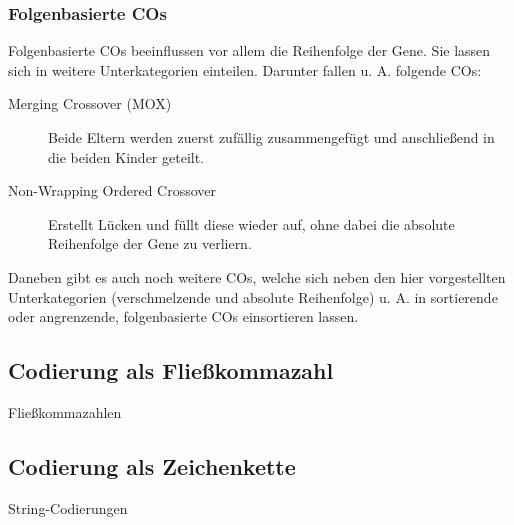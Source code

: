 	\subsubsection{Folgenbasierte COs}
	
		Folgenbasierte COs beeinflussen vor allem die Reihenfolge der Gene. Sie lassen sich in weitere Unterkategorien einteilen. Darunter fallen u. A. folgende COs:
		
		\begin{description}
			\item[Merging Crossover (MOX)] Beide Eltern werden zuerst zufällig zusammengefügt und anschließend in die beiden Kinder geteilt.\cite{OrderBasedForGCP}
			\item[Non-Wrapping Ordered Crossover] Erstellt Lücken und füllt diese wieder auf, ohne dabei die absolute Reihenfolge der Gene zu verliern.\cite{GAforTSP}
		\end{description}
	
		Daneben gibt es auch noch weitere COs, welche sich neben den hier vorgestellten Unterkategorien (verschmelzende und absolute Reihenfolge) u. A. in sortierende oder angrenzende, folgenbasierte COs einsortieren lassen.


\subsection{Codierung als Fließkommazahl}
\label{sec:FloatCod}

	Fließkommazahlen

\subsection{Codierung als Zeichenkette}
\label{sec:StrCod}

	String-Codierungen

